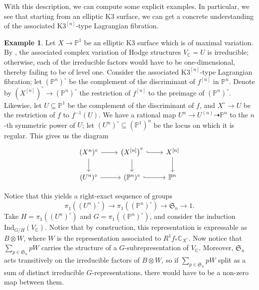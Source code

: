 \documentclass[12pt]{amsart}
\newcommand{\C}{\mathbb{C}}
\theoremstyle{definition}
\newtheorem{example}[theorem]{Example}
\theoremstyle{remark}
\numberwithin{equation}{section}
\begin{document}
With this description, we can compute some explicit examples. In particular,
we see that starting from an elliptic K3 surface, we can get a concrete understanding
of the associated \(\text{K3}^{[n]}\)-type Lagrangian fibration.

\begin{example}
Let \(X \to \mathbb{P}^1\) be an elliptic K3 surface
which is of maximal variation. By , the associated 
complex variation of Hodge structures \(V_\C = U\) is irreducible; otherwise, 
each of the irreducible factors would have to be one-dimensional, thereby failing 
to be of level one. Consider the associated \(\text{K3}^{[n]}\)-type Lagrangian 
fibration; let \((\mathbb{P}^n)^\circ\) be the complement of the discriminant of 
\(f^{[n]}\) in \(\mathbb{P}^n\).
Denote by \(\left(X^{[n]}\right)^\circ \to (\mathbb{P}^n)^\circ\)
the restriction of \(f^{[n]}\) to the preimage of \((\mathbb{P}^n)^\circ\).
Likewise, let \(U \subseteq \mathbb{P}^1\) be the complement of the discriminant of \(f\),
and \(X^\circ \to U\) be the restriction of \(f\) to \(f^{-1}(U)\).
We have a rational map \(U^n \to U^{(n)} \dashrightarrow \mathbb{P}^n\)
to the \(n\)-th symmetric power of \(U\); let
\((U^n)^\circ \subseteq (\mathbb{P}^1)^n\) be the locus on which it is regular. This 
gives us the diagram
\begin{equation*}
\begin{tikzcd}
	{(X^n)^\circ} \arrow{r} \arrow{d} & {\left(X^{[n]}\right)^\circ} \arrow[hook]{r} \arrow{d} & {X^{[n]}} \arrow{d} \\
	{(U^n)^\circ} \arrow{r} & {(\mathbb{P}^n)^\circ} \arrow[hook]{r} & {\mathbb{P}^n}
\end{tikzcd}
\end{equation*}

Notice that this yields a right-exact sequence of groups 
\begin{equation}
    \pi_1((U^n)^\circ) \to \pi_1((\mathbb{P}^n)^\circ) \to \mathfrak{S}_n \to 1.
\end{equation}
Take \(H = \pi_1((U^n)^\circ)\) and \(G = \pi_1((\mathbb{P}^n)^\circ)\), and 
consider the induction \(\text{Ind}_{G/H}(V_\C)\). Notice that 
by construction, this representation is expressable as \(B \otimes W\), where 
\(W\) is the representation associated to \(R^1 f_* \C_{X^\circ}\). Now notice that 
\(\sum_{p \in \mathfrak{S}_n} pW \) carries the structure of a 
\(G\)-subrepresentation of \(V_\C\). Moreover, \(\mathfrak{S}_n\) acts transitively 
on the irreducible factors of \(B \otimes W\), so if
\(\sum_{p \in \mathfrak{S}_n} pW \) split as a sum of distinct irreducible 
\(G\)-representations, there would have to be a non-zero map between them. 


\end{example}
\end{document}
